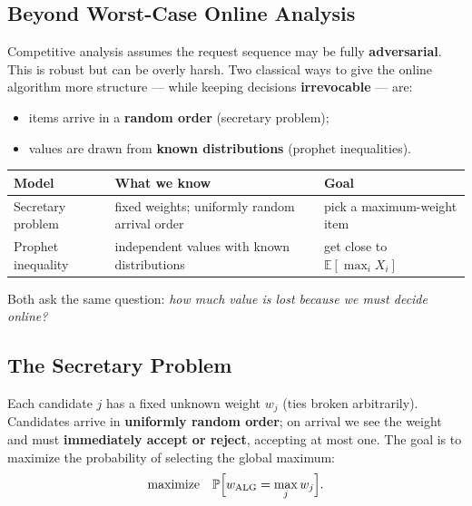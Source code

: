 %                         

\subsection{Beyond Worst-Case Online Analysis}

Competitive analysis assumes the request sequence may be fully \textbf{adversarial}. This is robust but can be overly harsh. Two classical ways to give the online algorithm more structure --- while keeping decisions \textbf{irrevocable} --- are:
\begin{itemize}
  \item items arrive in a \textbf{random order} (secretary problem);
  \item values are drawn from \textbf{known distributions} (prophet inequalities).
\end{itemize}

\begin{center}
\begin{tabular}{lll}
\toprule
\textbf{Model} & \textbf{What we know} & \textbf{Goal} \\
\midrule
Secretary problem  & fixed weights; uniformly random arrival order & pick a maximum-weight item \\
Prophet inequality & independent values with known distributions & get close to $\mathbb{E}[\max_i X_i]$ \\
\bottomrule
\end{tabular}
\end{center}

Both ask the same question: \emph{how much value is lost because we must decide online?}

\subsection{The Secretary Problem}

Each candidate $j$ has a fixed unknown weight $w_j$ (ties broken arbitrarily). Candidates arrive in \textbf{uniformly random order}; on arrival we see the weight and must \textbf{immediately accept or reject}, accepting at most one. The goal is to maximize the probability of selecting the global maximum:
\[
\text{maximize}\quad \mathbb{P}\Bigl[w_{\mathrm{ALG}} = \max_j w_j\Bigr].
\]

